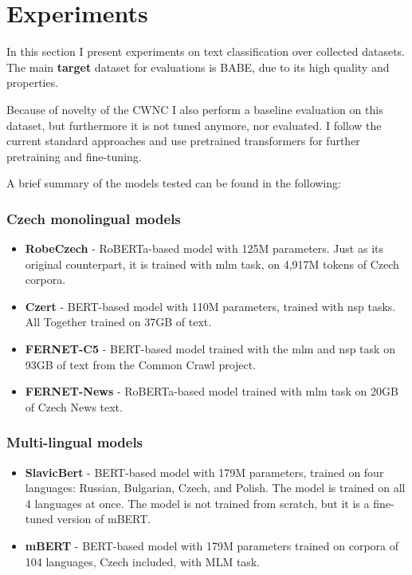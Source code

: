\chapter{Experiments}\label{experiments}
In this section I present experiments on text classification over collected datasets. The main \textbf{target} dataset for evaluations is BABE, due to its high quality and properties.

Because of novelty of the CWNC I also perform a baseline evaluation on this dataset, but furthermore it is not tuned anymore, nor evaluated.
I follow the current standard approaches and use pretrained transformers for further pretraining and fine-tuning. 

A brief summary of the models tested can be found in the following:




\subsection{Czech monolingual models}
\begin{itemize}
    \item \textbf{RobeCzech} \cite{strakarobeczech} - RoBERTa-based model with 125M parameters. Just as its original counterpart, it is trained with \gls{mlm} task, on 4,917M tokens of Czech corpora.
    \item \textbf{Czert} \cite{sido-etal-2021-czert} - BERT-based model with 110M parameters, trained with \gls{nsp} tasks. All Together trained on 37GB of text. 
    \item \textbf{FERNET-C5} \cite{lehevcka2021comparison} - BERT-based model trained with the \gls{mlm} and \gls{nsp} task on 93GB of text from the Common Crawl project.
    \item \textbf{FERNET-News} \cite{lehevcka2021comparison} - RoBERTa-based model trained with \gls{mlm} task on 20GB of Czech News text.
\end{itemize}






\subsection{Multi-lingual models}
\begin{itemize}
    \item \textbf{SlavicBert} \cite{arkhipov2019tuning} - BERT-based model with 179M parameters, trained on four languages: Russian, Bulgarian, Czech, and Polish. The model is trained on all 4 languages at once. The model is not trained from scratch, but it is a fine-tuned version of mBERT.
    \item \textbf{mBERT} - BERT-based model with 179M parameters trained on corpora of 104 languages, Czech included, with MLM task.
\end{itemize}





